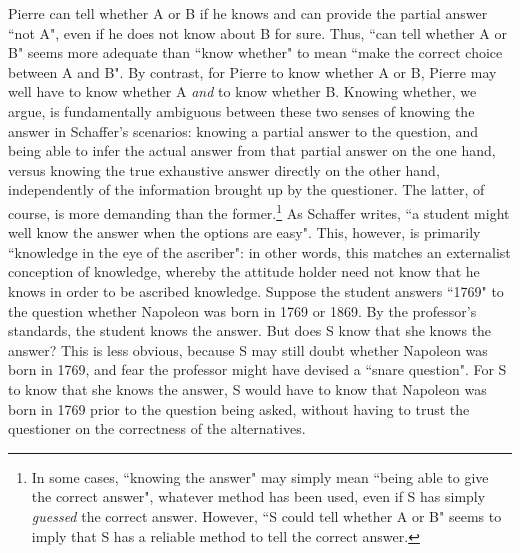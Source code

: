 Pierre can tell whether A or B if he knows and can provide the
partial answer ``not A", even if he does not know about B for
sure. Thus, ``can tell whether A or B" seems more adequate than
``know whether" to mean ``make the correct choice between A and
B". By contrast, for Pierre to know whether A or B, Pierre may
well have to know whether A \emph{and} to know whether B. Knowing
whether, we argue, is fundamentally ambiguous between these two
senses of knowing the answer in Schaffer's scenarios: knowing a
partial answer to the question, and being able to infer the actual
answer from that partial answer on the one hand, versus knowing
the true exhaustive answer directly on the other hand,
independently of the information brought up by the questioner. The
latter, of course, is more demanding than the former.\footnote{In
some cases, ``knowing the answer" may simply mean ``being able to
give the correct answer", whatever method has been used, even if S
has simply \emph{guessed} the correct answer. However, ``S could
tell whether A or B" seems to imply that S has a reliable method
to tell the correct answer.} As Schaffer writes, ``a student might
well know the answer when the options are easy". This, however, is
primarily ``knowledge in the eye of the ascriber": in other words,
this matches an externalist conception of knowledge, whereby the
attitude holder need not know that he knows in order to be
ascribed knowledge. Suppose the student answers ``1769" to the
question whether Napoleon was born in 1769 or 1869. By the
professor's standards, the student knows the answer. But does S
know that she knows the answer? This is less obvious, because S
may still doubt whether Napoleon was born in 1769, and fear the
professor might have devised a ``snare question". For S to know
that she knows the answer, S would have to know that Napoleon was
born in 1769 prior to the question being asked, without having to
trust the questioner on the correctness of the alternatives.
